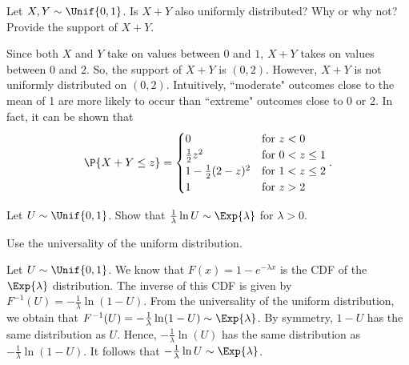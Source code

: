 	\begin{exercise}\label{ex:chap05:03}
		Let $X, Y \sim \Unif{0,1}$. Is $X + Y$ also uniformly distributed? Why or why not? Provide the support of $X + Y$.
		\begin{solution}
			Since both $X$ and $Y$ take on values between $0$ and $1$, $X + Y$ takes on values between $0$ and $2$. So, the support of $X + Y$ is $(0,2)$. However, $X + Y$ is not uniformly distributed on $(0,2)$. Intuitively, ``moderate" outcomes close to the mean of 1 are more likely to occur than ``extreme" outcomes close to 0 or 2. In fact, it can be shown that
			\begin{align*}
				\P{X + Y \leq z} =
				\begin{cases}
					0 & \text{for } z < 0 \\
					\frac{1}{2} z^2 & \text{for } 0 < z \leq 1 \\
					1 - \frac{1}{2} (2 - z)^2 & \text{for } 1 < z \leq 2 \\
					1 & \text{for } z > 2
				\end{cases}.
			\end{align*}
		\end{solution}
	\end{exercise}
	
	\begin{exercise}
		Let $U \sim \Unif{0,1}$. Show that $\frac{1}{\lambda} \ln U \sim \Exp{\lambda}$ for $\lambda > 0$.
		\begin{hint}
			Use the universality of the uniform distribution.
		\end{hint}
		\begin{solution}
			Let $U \sim \Unif{0,1}$. We know that $F(x) = 1 - e^{- \lambda x}$ is the CDF of the $\Exp{\lambda}$ distribution. The inverse of this CDF is given by $F^{-1}(U) = - \frac{1}{\lambda} \ln(1 - U)$. From the universality of the uniform distribution, we obtain that $F^{-1}(U) = - \frac{1}{\lambda} \ln(1 - U) \sim \Exp{\lambda}$. By symmetry, $1 - U$ has the same distribution as $U$. Hence, $- \frac{1}{\lambda} \ln(U)$ has the same distribution as $- \frac{1}{\lambda} \ln(1 - U)$. It follows that $- \frac{1}{\lambda} \ln U \sim \Exp{\lambda}$.
		\end{solution}
	\end{exercise}
	
